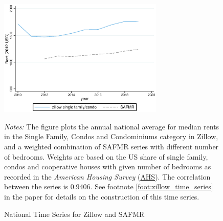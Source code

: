 \begin{figure}[!h]
	\centering
	\caption{National Time Series for Zillow and SAFMR}
	\label{fig:trend_zillow_safmrwgt}
	\includegraphics[width = 0.7\textwidth]{../../analysis/zillow_benchmark/output/trend_zillow_safmrwgt_zipcode_avg.eps}
	\begin{minipage}{0.95\textwidth} \footnotesize
		\vspace{3mm}
		\textit{Notes:} The figure plots the annual national average for median	rents in the Single 
		Family, Condos and Condominiums category in Zillow, and a weighted combination of SAFMR series 
		with different number of bedrooms. Weights are based on the US share of single family, 
		condos and cooperative houses with given number of bedrooms as recorded in the \textit{American 
		Housing Survey} (\href{https://www.census.gov/programs-surveys/ahs.html}{AHS}). The correlation
		between the series is 0.9406. %
		See footnote \ref{foot:zillow_time_series} in the paper for details on the construction of this 
		time series.  
	\end{minipage}
\end{figure}


